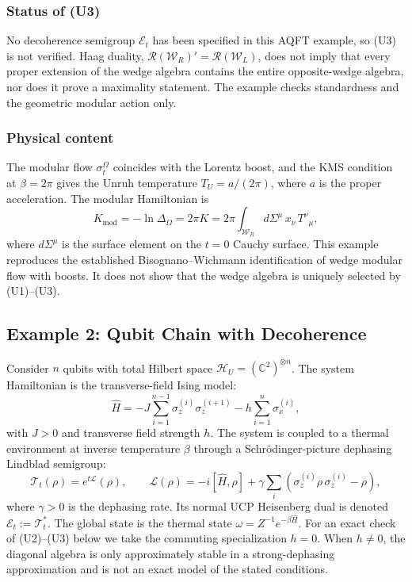 \documentclass[12pt,a4paper]{article}
\begin{document}
\subsubsection{Status of (U3)}

No decoherence semigroup $\mathcal E_t$ has been specified in this AQFT example, so (U3) is not verified.  Haag duality, $\mathcal R(\mathcal W_R)'=\mathcal R(\mathcal W_L)$, does not imply that every proper extension of the wedge algebra contains the entire opposite-wedge algebra, nor does it prove a maximality statement.  The example checks standardness and the geometric modular action only.

\subsubsection{Physical content}

The modular flow $\sigma_t^\Omega$ coincides with the Lorentz boost, and the KMS condition at $\beta = 2\pi$ gives the Unruh temperature $T_U = a/(2\pi)$, where $a$ is the proper acceleration.
The modular Hamiltonian is
\begin{equation}
K_{\mathrm{mod}} = -\ln \Delta_\Omega = 2\pi K = 2\pi \int_{\mathcal{W}_R} d\Sigma^\mu\, x_\nu\, T^{\nu}{}_\mu,
\end{equation}
where $d\Sigma^\mu$ is the surface element on the $t = 0$ Cauchy surface.
This example reproduces the established Bisognano--Wichmann identification of wedge modular flow with boosts.  It does not show that the wedge algebra is uniquely selected by (U1)--(U3).


\subsection{Example 2: Qubit Chain with Decoherence}
\label{sec:qubit}

Consider $n$ qubits with total Hilbert space $\mathcal{H}_U = (\mathbb{C}^2)^{\otimes n}$.
The system Hamiltonian is the transverse-field Ising model:
\begin{equation}
\hat{H} = -J \sum_{i=1}^{n-1} \sigma_z^{(i)} \sigma_z^{(i+1)} - h \sum_{i=1}^{n} \sigma_x^{(i)},
\end{equation}
with $J > 0$ and transverse field strength $h$.
The system is coupled to a thermal environment at inverse temperature $\beta$ through a Schr\"odinger-picture dephasing Lindblad semigroup:
\begin{equation}
\label{eq:lindblad}
\mathcal{T}_t(\rho) = e^{t\mathcal{L}}(\rho), \qquad \mathcal{L}(\rho) = -i[\hat{H}, \rho] + \gamma \sum_i \left(\sigma_z^{(i)} \rho\, \sigma_z^{(i)} - \rho\right),
\end{equation}
where $\gamma > 0$ is the dephasing rate.  Its normal UCP Heisenberg dual is denoted $\mathcal E_t:=\mathcal T_t^*$.
The global state is the thermal state $\omega = Z^{-1} e^{-\beta \hat{H}}$.  For an exact check of (U2)--(U3) below we take the commuting specialization $h=0$.  When $h\ne0$, the diagonal algebra is only approximately stable in a strong-dephasing approximation and is not an exact model of the stated conditions.
\end{document}
